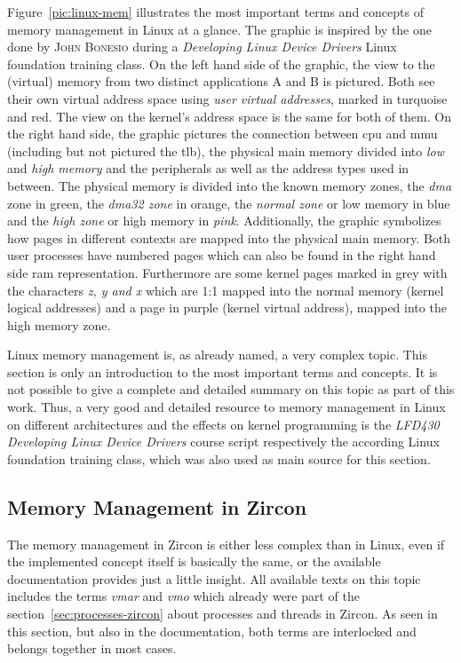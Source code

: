 Figure~\ref{pic:linux-mem} illustrates the most important terms and concepts of memory management in Linux at a glance.
The graphic is inspired by the one done by \textsc{John Bonesio} during a \textit{Developing Linux Device Drivers} Linux foundation training class.
On the left hand side of the graphic, the view to the (virtual) memory from two distinct applications A and B is pictured.
Both see their own virtual address space using \textit{user virtual addresses}, marked in turquoise and red.
The view on the kernel's address space is the same for both of them.
On the right hand side, the graphic pictures the connection between \ac{cpu} and \ac{mmu} (including but not pictured the \ac{tlb}),  the physical main memory divided into \textit{low} and \textit{high memory} and the peripherals as well as the address types used in between.
The physical memory is divided into the known memory zones, the \textit{\ac{dma}} zone in green, the \textit{\ac{dma}32 zone} in orange, the \textit{normal zone} or low memory in blue and the \textit{high zone} or high memory in \textit{pink}.
Additionally, the graphic symbolizes how pages in different contexts are mapped into the physical main memory.
Both user processes have numbered pages which can also be found in the right hand side \ac{ram} representation.
Furthermore are some kernel pages marked in grey with the characters \textit{z, y and x} which are 1:1 mapped into the normal memory (kernel logical addresses) and a page in purple (kernel virtual address), mapped into the high memory zone. 

Linux memory management is, as already named, a very complex topic.
This section is only an introduction to the most important terms and concepts.
It is not possible to give a complete and detailed summary on this topic as part of this work.
Thus, a very good and detailed resource to memory management in Linux on different architectures and the effects on kernel programming is the \textit{LFD430 Developing Linux Device Drivers} course script\cite{lfd430} respectively the according Linux foundation training class, which was also used as main source for this section. 
%

\subsection{Memory Management in Zircon} 
The memory management in Zircon is either less complex than in Linux, even if the implemented concept itself is basically the same, or the available documentation provides just a little insight.
All available texts on this topic includes the terms \textit{\acf{vmar}} and \textit{\acf{vmo}} which already were part of the section~\ref{sec:processes-zircon} about processes and threads in Zircon.
As seen in this section, but also in the documentation, both terms are interlocked and belongs together in most cases.

